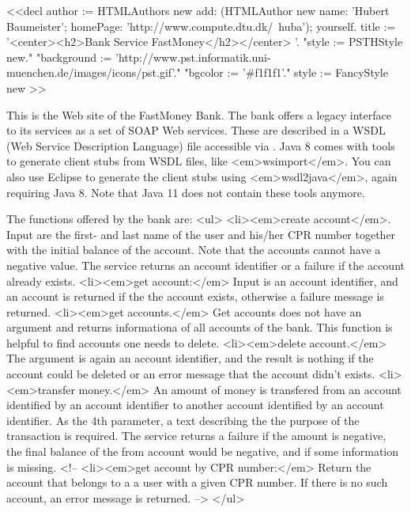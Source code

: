 <<decl
author := HTMLAuthors new add: (HTMLAuthor new name: 'Hubert Baumeister'; homePage: 'http://www.compute.dtu.dk/~huba'); yourself.
title := '<center><h2>Bank Service FastMoney</h2></center> '.
"style := PSTHStyle new."
"background := 'http://www.pst.informatik.uni-muenchen.de/images/icons/pst.gif'."
"bgcolor := '#f1f1f1'."
style := FancyStyle new
>>

This is the Web site of the FastMoney Bank. The bank offers a legacy interface to its services as a set of SOAP Web services. These are described in a WSDL (Web Service Description Language) file accessible via . Java 8 comes with tools to generate client stubs from WSDL files, like <em>wsimport</em>. You can also use Eclipse to generate the client stubs using <em>wsdl2java</em>, again requiring Java 8.  Note that Java 11 does not contain these tools anymore.

The functions offered by the bank are:
<ul>
   <li><em>create account</em>. Input are the first- and last name of the user and his/her CPR number together with the initial balance of the account. Note that the accounts cannot have a negative value. The service returns an account identifier or a failure if the account already exists.
   <li><em>get account:</em> Input is an account identifier, and an account is returned if the the account exists, otherwise a failure message is returned.
   <li><em>get accounts.</em> Get accounts does not have an argument and returns informationa of all accounts of the bank. This function is helpful to find accounts one needs to delete.
   <li><em>delete account.</em> The argument is again an account identifier, and the result is nothing if the account could be deleted or an error message that the account didn't exists.
   <li><em>transfer money.</em> An amount of money is transfered from an account identified by an account identifier to another account identified by an account identifier. As the 4th parameter, a text describing the the purpose of the transaction is required. The service returns a failure if the amount is negative, the final balance of the from account would be negative, and if some information is missing.
   <!-- <li><em>get account by CPR number:</em> Return the account that belongs to a a user with a given CPR number. If there is no such account, an error message is returned. -->
</ul>

